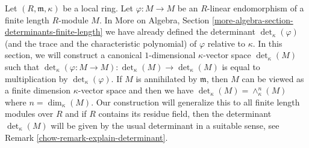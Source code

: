 \medskip\noindent
Let $(R, \mathfrak m, \kappa)$ be a local ring. Let
$\varphi : M \to M$ be an $R$-linear endomorphism of
a finite length $R$-module $M$. In More on Algebra, Section
\ref{more-algebra-section-determinants-finite-length}
we have already defined the determinant $\det_\kappa(\varphi)$
(and the trace and the characteristic polynomial)
of $\varphi$ relative to $\kappa$. In this section, we will
construct a canonical $1$-dimensional $\kappa$-vector space
$\det_\kappa(M)$ such that
$\det_\kappa(\varphi : M \to M) : \det_\kappa(M) \to \det_\kappa(M)$
is equal to multiplication by $\det_\kappa(\varphi)$.
If $M$ is annihilated by $\mathfrak m$, then $M$ can be viewed
as a finite dimension $\kappa$-vector space and then we have
$\det_\kappa(M) = \wedge^n_\kappa(M)$ where $n = \dim_\kappa(M)$.
Our construction will generalize this to all finite length modules
over $R$ and if $R$ contains its residue field, then the determinant
$\det_\kappa(M)$ will be given by the usual determinant in a suitable
sense, see Remark \ref{chow-remark-explain-determinant}.

